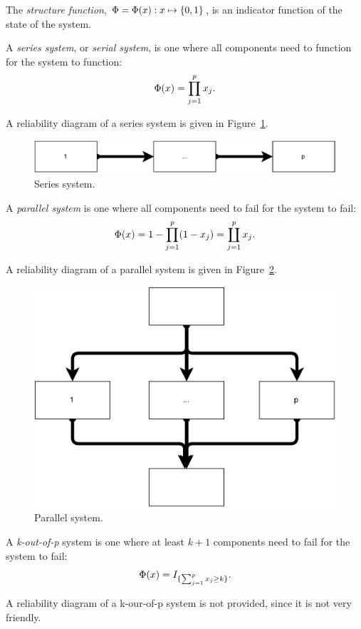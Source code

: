 \begin{definition}
The \emph{structure function}, $\Phi=\Phi(x):x \mapsto \{ 0,1 \}$, is an indicator function of the state of the system.
\end{definition}

\begin{definition}
A \emph{series system}, or \emph{serial system}, is one where all components need to function for the system to function: $$\Phi(x)=\prod_{j=1}^{p}x_j.$$
\end{definition}
A reliability diagram of a series system is given in Figure~\ref{fig:series_system}.
\begin{figure}[ht]
\centering
\includegraphics[width=0.5\linewidth]{art/series_system}
\caption{Series system.}
\label{fig:series_system}
\end{figure}


\begin{definition}
A \emph{parallel system} is one where all components need to fail for the system to fail:
$$\Phi(x)=1-\prod_{j=1}^{p} (1-x_j)= \coprod_{j=1}^p x_j.$$
\end{definition}
A reliability diagram of a parallel system is given in Figure~\ref{fig:parallel_system}.
\begin{figure}[ht]
\centering
\includegraphics[width=0.5\linewidth]{art/parallel_system}
\caption{Parallel system.}
\label{fig:parallel_system}
\end{figure}


\begin{definition}
A \emph{k-out-of-p} system is one where at least $k+1$ components need to fail for the system to fail:
$$\Phi(x)=I_{\{ \sum_{j=1}^{p} x_j \geq k \}}.$$
\end{definition}
A reliability diagram of a k-our-of-p system is not provided, since it is not very friendly.




